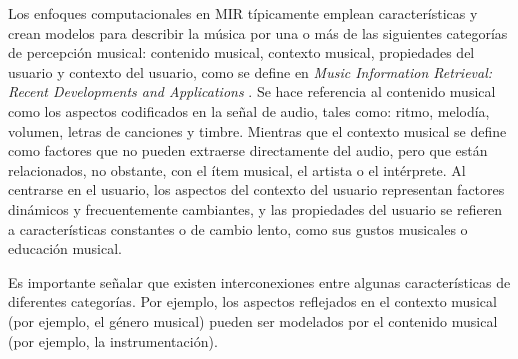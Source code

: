 Los enfoques computacionales en MIR típicamente emplean características y crean modelos para describir la música por una o más de las siguientes categorías de percepción musical: contenido musical, contexto musical, propiedades del usuario y contexto del usuario, como se define en \textit{Music Information Retrieval: Recent Developments and Applications} \cite{Schedl2014MusicIR}. Se hace referencia al contenido musical como los aspectos codificados en la señal de audio, tales como: ritmo, melodía, volumen, letras de canciones y timbre. Mientras que el contexto musical se define como factores que no pueden extraerse directamente del audio, pero que están relacionados, no obstante, con el ítem musical, el artista o el intérprete. Al centrarse en el usuario, los aspectos del contexto del usuario representan factores dinámicos y frecuentemente cambiantes, y las propiedades del usuario se refieren a características constantes o de cambio lento, como sus gustos musicales o educación musical.

Es importante señalar que existen interconexiones entre algunas características de diferentes categorías. Por ejemplo, los aspectos reflejados en el contexto musical (por ejemplo, el género musical) pueden ser modelados por el contenido musical (por ejemplo, la instrumentación).

